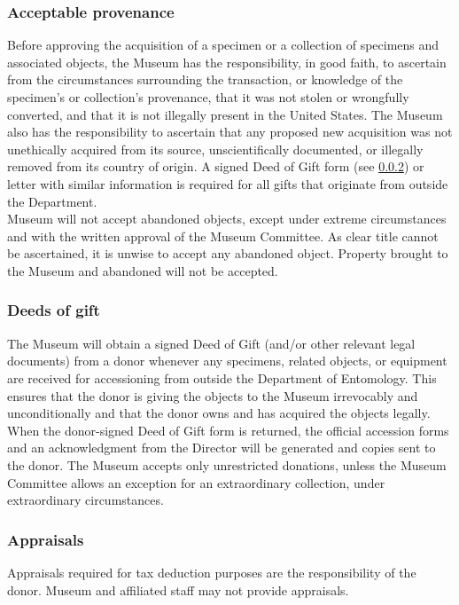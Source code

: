 \documentclass[letterpaper, 11pt]{article}
\begin{document}
\subsubsection{Acceptable provenance}\label{sec:provenance}
Before approving the acquisition of a specimen or a collection of specimens and associated objects, the Museum has the responsibility, in good faith, to ascertain from the circumstances surrounding the transaction, or knowledge of the specimen's or collection's provenance, that it was not stolen or wrongfully converted, and that it is not illegally present in the United States. The Museum also has the responsibility to ascertain that any proposed new acquisition was not unethically acquired from its source, unscientifically documented, or illegally removed from its country of origin. A signed Deed of Gift form (see \ref{sec:deedsofgift}) or letter with similar information is required for all gifts that originate from outside the Department.\\

\noindent{}Museum will not accept abandoned objects, except under extreme circumstances and with the written approval of the Museum Committee. As clear title cannot be ascertained, it is unwise to accept any abandoned object. Property brought to the Museum and abandoned will not be accepted.

\subsubsection{Deeds of gift}\label{sec:deedsofgift}
The Museum will obtain a signed Deed of Gift (and/or other relevant legal documents) from a donor whenever any specimens, related objects, or equipment are received for accessioning from outside the Department of Entomology. This ensures that the donor is giving the objects to the Museum irrevocably and unconditionally and that the donor owns and has acquired the objects legally. When the donor-signed Deed of Gift form is returned, the official accession forms and an acknowledgment from the Director will be generated and copies sent to the donor. The Museum accepts only unrestricted donations, unless the Museum Committee allows an exception for an extraordinary collection, under extraordinary circumstances.

\subsubsection{Appraisals}
Appraisals required for tax deduction purposes are the responsibility of the donor. Museum and affiliated staff may not provide appraisals.
\end{document}
